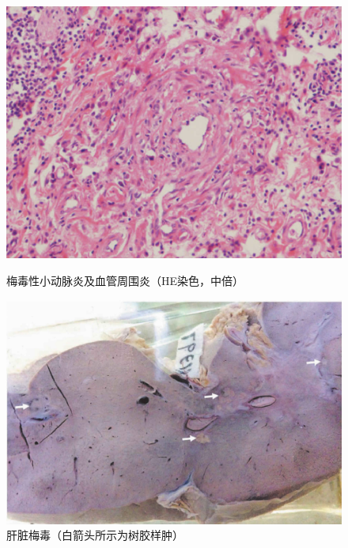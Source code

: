 \begin{figure}[!htbp]
    \centering
    \begin{minipage}[t]{0.48\textwidth}
    \includegraphics[height=.2\textheight]{./images/Image00241.jpg}
    \captionsetup{justification=centering}
    \caption{梅毒性小动脉炎及血管周围炎（HE染色，中倍）}
    \label{fig14-16}
    \end{minipage}
    \begin{minipage}[t]{0.48\textwidth}
        \includegraphics[height=.2\textheight]{./images/Image00242.jpg}
        \captionsetup{justification=centering}
        \caption{肝脏梅毒（白箭头所示为树胶样肿）}
        \label{fig14-17}
    \end{minipage}
\end{figure}


